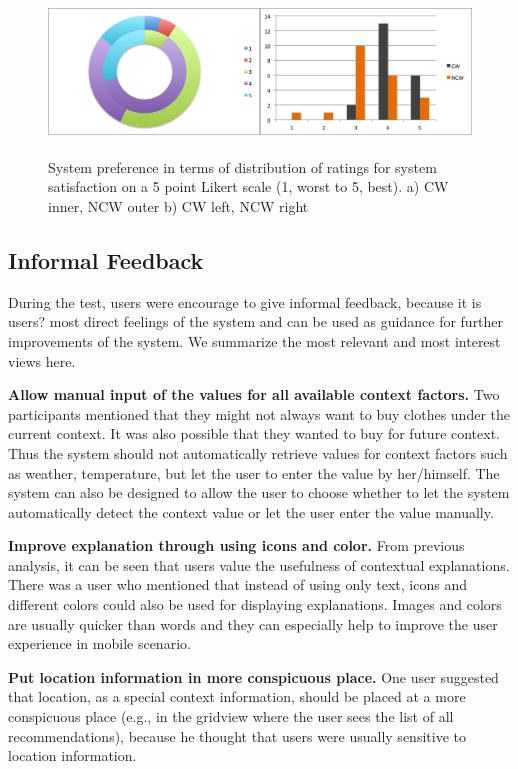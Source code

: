\begin{figure}[H]
	\centering
	\includegraphics[height=1.7in]{figures/systemSatisfaction.png}
	\caption{System preference in terms of distribution of ratings for system satisfaction on a 5 point Likert scale (1, worst to 5, best). a) CW inner, NCW outer b) CW left, NCW right}
	\label{fig:systemSatisfaction}
\end{figure}

\subsection{Informal Feedback} \label{sec:results_if}

During the test, users were encourage to give informal feedback, because it is users? most direct feelings of the system and can be used as guidance for further improvements of the system. We summarize the most relevant and most interest views here.

\textbf{Allow manual input of the values for all available context factors.} Two participants mentioned that they might not always want to buy clothes under the current context. It was also possible that they wanted to buy for future context. Thus the system should not automatically retrieve values for context factors such as weather, temperature, but let the user to enter the value by her/himself. The system can also be designed to allow the user to choose whether to let the system automatically detect the context value or let the user enter the value manually.

\textbf{Improve explanation through using icons and color.} From previous analysis, it can be seen that users value the usefulness of contextual explanations. There was a user who mentioned that instead of using only text, icons and different colors could also be used for displaying explanations. Images and colors are usually quicker than words and they can especially help to improve the user experience in mobile scenario.
 
\textbf{Put location information in more conspicuous place.} One user suggested that location, as a special context information, should be placed at a more conspicuous place (e.g., in the gridview where the user sees the list of all recommendations), because he thought that users were usually sensitive to location information.  

